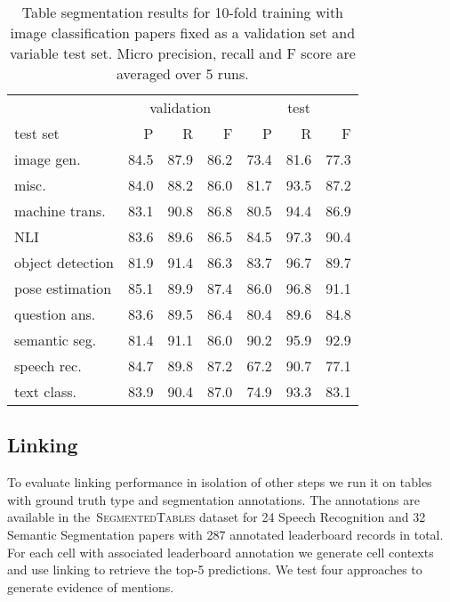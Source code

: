 \documentclass[11pt,a4paper]{article}
\newcommand{\finegrained}{\textsc{SegmentedTables}}
\begin{document}
\begin{table}[t]
\small
    \centering
    \setlength{\tabcolsep}{4pt}
    \caption{Table segmentation results for 10-fold training with image classification papers fixed as a validation set and variable test set. Micro precision, recall and F score are averaged over 5 runs.}
    \label{tab:results:segmentation:kfolds}
    \begin{tabular}{lrrrrrr}
     \toprule
     & \multicolumn{3}{c}{validation} & \multicolumn{3}{c}{test}\\
     \cmidrule(lr){2-4}\cmidrule(lr){5-7}
 test set & P & R & F & P & R & F \\\midrule
image gen.       &       84.5 &    87.9 & 86.2 &       73.4 &    81.6 & 77.3 \\
misc.            &       84.0 &    88.2 & 86.0 &       81.7 &    93.5 & 87.2 \\
machine trans.   &       83.1 &    90.8 & 86.8 &       80.5 &    94.4 & 86.9 \\
NLI              &       83.6 &    89.6 & 86.5 &       84.5 &    97.3 & 90.4 \\
object detection &       81.9 &    91.4 & 86.3 &       83.7 &    96.7 & 89.7 \\
pose estimation  &       85.1 &    89.9 & 87.4 &       86.0 &    96.8 & 91.1 \\
question ans.    &       83.6 &    89.5 & 86.4 &       80.4 &    89.6 & 84.8 \\
semantic seg.    &       81.4 &    91.1 & 86.0 &       90.2 &    95.9 & 92.9 \\
speech rec.      &       84.7 &    89.8 & 87.2 &       67.2 &    90.7 & 77.1 \\
text class.      &       83.9 &    90.4 & 87.0 &       74.9 &    93.3 & 83.1 \\
\bottomrule
    \end{tabular}
\end{table}

\subsection{Linking}
\label{sec:ablation:linking}
To evaluate linking performance in isolation of other steps we run it on tables with ground truth type and segmentation annotations. The annotations are available in the~\finegrained{} dataset for 24 Speech Recognition and 32 Semantic Segmentation papers with 287 annotated leaderboard records in total. For each cell with associated leaderboard annotation we generate cell contexts and use linking to retrieve the top-5 predictions.
We test four approaches to generate evidence of mentions.
\end{document}
